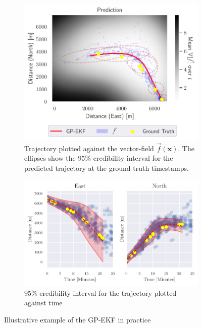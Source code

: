 \begin{figure}
    \centering
    \begin{subfigure}{\textwidth}
        \centering
        \includegraphics[width=\textwidth]{figures/dyngp/gp_ekf.pdf}
        \caption{Trajectory plotted against the vector-field $\vec{f}(\boldsymbol{x})$. The ellipses show the $95\%$ credibility interval for the predicted trajectory at the ground-truth timestamps.}
    \end{subfigure}
    \begin{subfigure}{\textwidth}
        \centering
        \includegraphics[width=\textwidth]{figures/dyngp/gp_ekf_state.pdf}
        \caption{$95\%$ credibility interval for the trajectory plotted against time}
    \end{subfigure}
    \caption{Illustrative example of the GP-EKF in practice}
    \label{fig:gp_ekf}
\end{figure}



